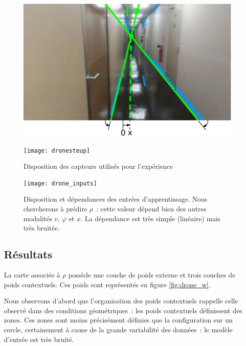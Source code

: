 \documentclass[../main]{subfiles}
\begin{document}
\begin{figure}
	\begin{minipage}{0.5\textwidth}
	\includegraphics[width=\textwidth]{visudrone.pdf}
	\end{minipage}
	\begin{minipage}{0.5\textwidth}
	\texttt{[image: dronesteup]}
	\end{minipage}
	\caption{Disposition des capteurs utilisés pour l'expérience}
	\label{fig:drone}
	\end{figure}

\begin{figure}
	\centering\texttt{[image: drone\_inputs]}
	\caption{Disposition et dépendances des entrées d'apprentissage. Nous chercherons à prédire $\rho$~: cette valeur dépend bien des autres modalités $v$, $\varphi$ et $x$. La dépendance est très simple (linéaire) mais très bruitée. \label{fig:drone_inp}}
\end{figure}

\subsection{Résultats}

La carte associée à $\rho$ possède une couche de poids externe et trois couches de poids contextuels. 
Ces poids sont représentés en figure \ref{fig:drone_w}. 

Nous observons d'abord que l'organisation des poids contextuels rappelle celle observé dans des conditions géométriques~: les poids contextuels définissent des zones. 
Ces zones sont moins précisément définies que la configuration sur un cercle, certainement à cause de la grande variabilité des données~: le modèle d'entrée est très bruité.
\end{document}
